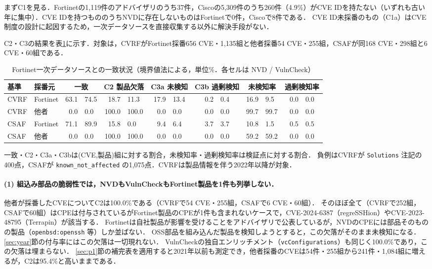 まずC1を見る．Fortinetの1,119件のアドバイザリのうち37件，Ciscoの5,309件のうち260件（4.9\%）がCVE IDを持たない（いずれも古い年に集中）．CVE IDを持つもののうちNVDに存在しないものはFortinetで0件，Ciscoで8件である．
CVE ID未採番のもの（C1a）はCVE制度の設計に起因するため，一次データソースを直接収集する以外に解決手段がない．

C2・C3の結果を表\ref{tab:match}に示す．対象は，CVRFがFortinet採番656 CVE・1,135組と他者採番54 CVE・255組，CSAFが同168 CVE・298組と6 CVE・60組である．

\begin{table}[htbp]
  \caption{Fortinet一次データソースとの一致状況（境界値法による，単位\%．各セルは NVD / VulnCheck）}
  \label{tab:match}
  \begin{center}
  \begin{tabular}{ll r@{\,/\,}l r@{\,/\,}l r@{\,/\,}l r@{\,/\,}l r@{\,/\,}l r@{\,/\,}l}
    \hline
    基準 & 採番元 & \multicolumn{2}{c}{一致} & \multicolumn{2}{c}{C2 製品欠落} & \multicolumn{2}{c}{C3a 未検知} & \multicolumn{2}{c}{C3b 過剰検知} & \multicolumn{2}{c}{未検知率} & \multicolumn{2}{c}{過剰検知率} \\
    \hline
    CVRF & Fortinet & 63.1 & 74.5 & 18.7 & 11.3 & 17.9 & 13.4 & 0.2 & 0.4 & 16.9 & 9.5 & 0.0 & 0.0 \\
    CVRF & 他者 & 0.0 & 0.0 & 100.0 & 100.0 & 0.0 & 0.0 & 0.0 & 0.0 & 99.7 & 99.7 & 0.0 & 0.0 \\
    CSAF & Fortinet & 71.1 & 89.9 & 15.8 & 0.0 & 9.4 & 6.4 & 3.7 & 3.7 & 10.8 & 1.5 & 0.5 & 0.5 \\
    CSAF & 他者 & 0.0 & 0.0 & 100.0 & 100.0 & 0.0 & 0.0 & 0.0 & 0.0 & 59.2 & 59.2 & 0.0 & 0.0 \\
    \hline
  \end{tabular}
  \end{center}
  \footnotesize
  一致・C2・C3a・C3bは(CVE,製品)組に対する割合，未検知率・過剰検知率は検証点に対する割合．
  負例はCVRFが \texttt{Solutions} 注記の400点，CSAFが \texttt{known\_not\_affected} の1,075点．CVRFは製品情報を伴う2022年以降が対象．
\end{table}

\paragraph{(1) 組込み部品の脆弱性では，NVDもVulnCheckもFortinet製品を1件も列挙しない．}
他者が採番したCVEについてC2は100.0\%である（CVRFで54 CVE・255組，CSAFで6 CVE・60組）．
そのほぼ全て（CVRFで252組，CSAFで60組）はCPEは付与されているがFortinet製品のCPEが1件も含まれないケースで，CVE-2024-6387（regreSSHion）やCVE-2023-48795（Terrapin）が該当する．
Fortinetは自社製品が影響を受けることをアドバイザリで公表しているが，NVDのCPEには部品そのものの製品（\texttt{openbsd:openssh} 等）しか並ばない．
OSS部品を組み込んだ製品を検知しようとすると，この欠落がそのまま未検知になる．
\ref{sec:year}節の付与率にはこの欠落は一切現れない．
VulnCheckの独自エンリッチメント（\texttt{vcConfigurations}）も同じく100.0\%であり，この欠落は埋まらない．
\ref{sec:p1}節の補完表を適用すると2021年以前も測定でき，他者採番のCVEは54件・255組から241件・1,084組に増えるが，C2は95.4\%と高いままである．

